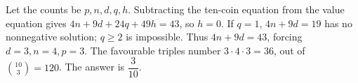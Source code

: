 Let the counts be $p,n,d,q,h$. Subtracting the ten-coin equation from the value equation gives $4n+9d+24q+49h=43$, so $h=0$. If $q=1$, $4n+9d=19$ has no nonnegative solution; $q\ge2$ is impossible. Thus $4n+9d=43$, forcing $d=3,n=4,p=3$. The favourable triples number $3\cdot4\cdot3=36$, out of $\binom{10}3=120$. The answer is $\boxed{\dfrac{3}{10}}$.
